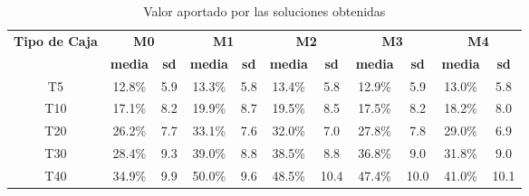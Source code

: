 \begin{table}[H]
    \centering
    \caption{Valor aportado por las soluciones obtenidas}
    \label{tab:valor_aportado}
    \begin{tabular}{|c|c|c|c|c|c|c|c|c|c|c|}
        \hline
        \multirow{2}{*}{\textbf{Tipo de Caja}} & \multicolumn{2}{c|}{\textbf{M0}} & \multicolumn{2}{c|}{\textbf{M1}} & \multicolumn{2}{c|}{\textbf{M2}} & \multicolumn{2}{c|}{\textbf{M3}} & \multicolumn{2}{c|}{\textbf{M4}}                                                                             \\ \cline{2-11}
                                               & \textbf{media}                   & \textbf{sd}                      & \textbf{media}                   & \textbf{sd}                      & \textbf{media}                   & \textbf{sd} & \textbf{media} & \textbf{sd} & \textbf{media} & \textbf{sd} \\ \hline
        T5                                     & 12.8\%                           & 5.9                              & 13.3\%                           & 5.8                              & 13.4\%                           & 5.8         & 12.9\%         & 5.9         & 13.0\%         & 5.8         \\ \hline
        T10                                    & 17.1\%                           & 8.2                              & 19.9\%                           & 8.7                              & 19.5\%                           & 8.5         & 17.5\%         & 8.2         & 18.2\%         & 8.0         \\ \hline
        T20                                    & 26.2\%                           & 7.7                              & 33.1\%                           & 7.6                              & 32.0\%                           & 7.0         & 27.8\%         & 7.8         & 29.0\%         & 6.9         \\ \hline
        T30                                    & 28.4\%                           & 9.3                              & 39.0\%                           & 8.8                              & 38.5\%                           & 8.8         & 36.8\%         & 9.0         & 31.8\%         & 9.0         \\ \hline
        T40                                    & 34.9\%                           & 9.9                              & 50.0\%                           & 9.6                              & 48.5\%                           & 10.4        & 47.4\%         & 10.0        & 41.0\%         & 10.1        \\ \hline
    \end{tabular}
\end{table}

